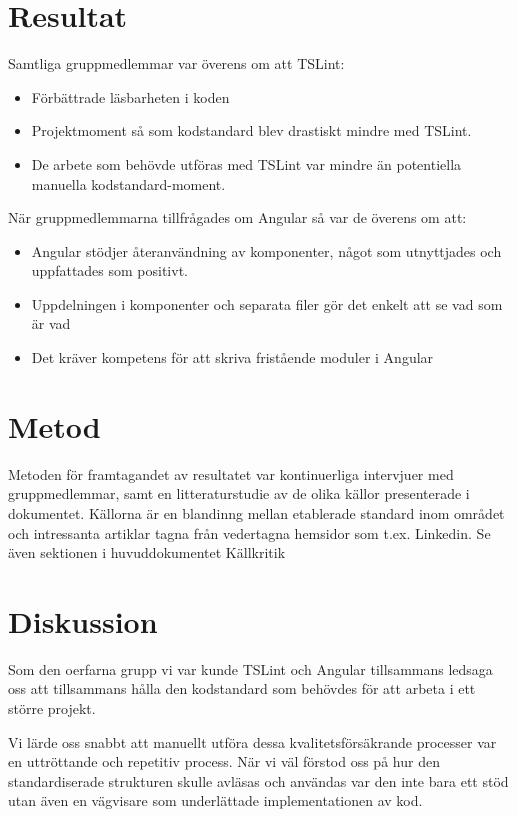 \section{Resultat} 


Samtliga gruppmedlemmar var överens om att TSLint:

\begin{itemize}
	\item Förbättrade läsbarheten i koden
	\item Projektmoment så som kodstandard blev drastiskt mindre med TSLint.
	\item De arbete som behövde utföras med TSLint var mindre än potentiella manuella kodstandard-moment.
\end{itemize}

När gruppmedlemmarna tillfrågades om Angular så var de överens om att:

\begin{itemize}
	\item Angular stödjer återanvändning av komponenter, något som utnyttjades och uppfattades som positivt.
	\item Uppdelningen i komponenter och separata filer gör det enkelt att se vad som är vad
	\item Det kräver kompetens för att skriva fristående moduler i Angular
\end{itemize}

\section{Metod}

Metoden för framtagandet av resultatet var kontinuerliga intervjuer med gruppmedlemmar, samt en litteraturstudie av de olika källor presenterade i dokumentet. Källorna är en blandinng mellan etablerade standard inom området och intressanta artiklar tagna från vedertagna hemsidor som t.ex. Linkedin. Se även sektionen i huvuddokumentet Källkritik

\section{Diskussion}

Som den oerfarna  grupp vi var kunde TSLint och Angular tillsammans ledsaga oss att tillsammans hålla den kodstandard som behövdes för att arbeta i ett större projekt. 

Vi lärde oss snabbt att manuellt utföra dessa kvalitetsförsäkrande processer var en uttröttande och repetitiv process. När vi väl förstod oss på hur den standardiserade strukturen skulle avläsas och användas var den inte bara ett stöd utan även en vägvisare som underlättade implementationen av kod.

